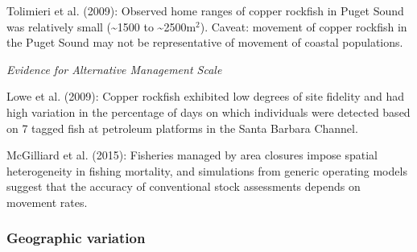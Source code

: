 \documentclass[11pt,
  english,
  a4paper,
]{article}
\begin{document}

Tolimieri et al. {(2009)\leavevmode\tagmcend\tagstructend}: Observed home ranges of copper rockfish in Puget Sound was relatively small (\textasciitilde1500 to \textasciitilde2500m{\(^2\)\leavevmode\tagmcend\tagstructend}). Caveat: movement of copper rockfish in the Puget Sound may not be representative of movement of coastal populations.

\leavevmode\tagmcend\tagstructend\par


\emph{Evidence for Alternative Management Scale}

\leavevmode\tagmcend\tagstructend\par


Lowe et al. {(2009)\leavevmode\tagmcend\tagstructend}: Copper rockfish exhibited low degrees of site fidelity and had high variation in the percentage of days on which individuals were detected based on 7 tagged fish at petroleum platforms in the Santa Barbara Channel.

\leavevmode\tagmcend\tagstructend\par


McGilliard et al. {(2015)\leavevmode\tagmcend\tagstructend}: Fisheries managed by area closures impose spatial heterogeneity in fishing mortality, and simulations from generic operating models suggest that the accuracy of conventional stock assessments depends on movement rates.

\leavevmode\tagmcend\tagstructend\par


\hypertarget{geographic-variation}{%
\subsubsection{Geographic variation}\label{geographic-variation}}

\leavevmode\tagmcend\tagstructend

\end{document}
